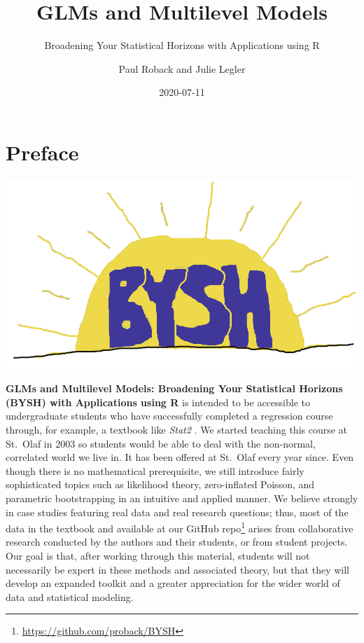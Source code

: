 \documentclass[
]{krantz}
\title{GLMs and Multilevel Models}
\subtitle{Broadening Your Statistical Horizons with Applications using R}
\author{Paul Roback and Julie Legler}
\date{2020-07-11}
\renewcommand{\href}[2]{#2\footnote{\url{#1}}}
\begin{document}
\maketitle


\thispagestyle{empty}

\setlength{\abovedisplayskip}{-5pt}
\setlength{\abovedisplayshortskip}{-5pt}

{
\hypersetup{linkcolor=}
\setcounter{tocdepth}{2}
\tableofcontents
}
\mainmatter

\hypertarget{preface}{%
\chapter*{Preface}\label{preface}}


\includegraphics[width=0.75\linewidth]{data/cover}

\textbf{GLMs and Multilevel Models: Broadening Your Statistical Horizons (BYSH) with Applications using R} \citet{RProject} is intended to be accessible to undergraduate students who have successfully completed a regression course through, for example, a textbook like \emph{Stat2} \citep{Cannon2019}. We started teaching this course at St.~Olaf in 2003 so students would be able to deal with the non-normal, correlated world we live in. It has been offered at St.~Olaf every year since. Even though there is no mathematical prerequisite, we still introduce fairly sophisticated topics such as likelihood theory, zero-inflated Poisson, and parametric bootstrapping in an intuitive and applied manner. We believe strongly in case studies featuring real data and real research questions; thus, most of the data in the textbook and \href{https://github.com/proback/BYSH}{available at our GitHub repo} arises from collaborative research conducted by the authors and their students, or from student projects. Our goal is that, after working through this material, students will not necessarily be expert in these methods and associated theory, but that they will develop an expanded toolkit and a greater appreciation for the wider world of data and statistical modeling.
\end{document}
